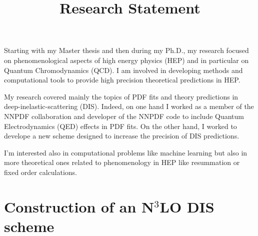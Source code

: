 \documentclass[11pt,a4paper]{moderncv}        %
\title{Research Statement}
\begin{document}

\makecvtitle

Starting with my Master thesis and then during my Ph.D., my research focused on phenomenological aspects of high energy physics (HEP)
and in particular on Quantum Chromodynamics (QCD).
I am involved in developing methods and computational tools to provide high precision theoretical predictions in HEP.


My research covered mainly the topics of PDF fits and theory predictions in deep-inelastic-scattering (DIS).
Indeed, on one hand I worked as a member of the NNPDF collaboration and developer of the NNPDF code to include
Quantum Electrodynamics (QED) effects in PDF fits.
On the other hand, I worked to develope a new scheme designed to increase the precision of DIS predictions.

I'm interested also in computational problems like machine learning but also in more theoretical ones related to phenomenology in 
HEP like resummation or fixed order calculations.

\section{Construction of an N$^3$LO DIS scheme}
\end{document}
